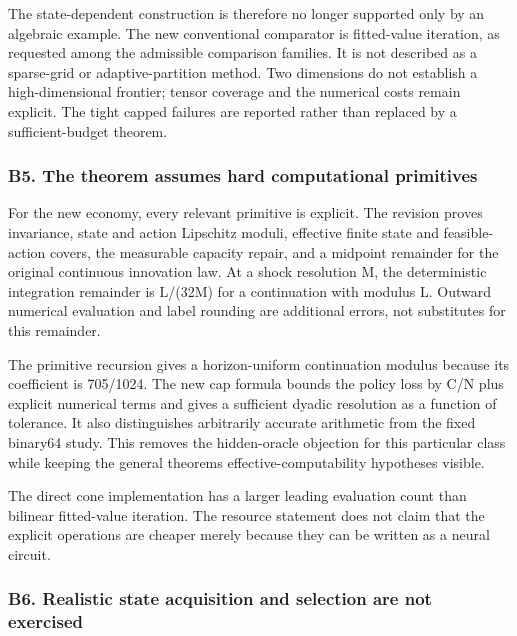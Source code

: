 \documentclass[ecta,nameyear,draft]{econsocart}
\begin{document}
The state-dependent construction is therefore no longer supported only
by an algebraic example. The new conventional comparator is fitted-value
iteration, as requested among the admissible comparison families. It is
not described as a sparse-grid or adaptive-partition method. Two
dimensions do not establish a high-dimensional frontier; tensor coverage
and the numerical costs remain explicit. The tight capped failures are
reported rather than replaced by a sufficient-budget theorem.

\hypertarget{b5-the-theorem-assumes-hard-computational-primitives}{%
\subsubsection{B5. The theorem assumes hard computational
primitives}\label{b5-the-theorem-assumes-hard-computational-primitives}}

For the new economy, every relevant primitive is explicit. The revision
proves invariance, state and action Lipschitz moduli, effective finite
state and feasible-action covers, the measurable capacity repair, and a
midpoint remainder for the original continuous innovation law. At a
shock resolution M, the deterministic integration remainder is L/(32M)
for a continuation with modulus L. Outward numerical evaluation and
label rounding are additional errors, not substitutes for this
remainder.

The primitive recursion gives a horizon-uniform continuation modulus
because its coefficient is 705/1024. The new cap formula bounds the
policy loss by C/N plus explicit numerical terms and gives a sufficient
dyadic resolution as a function of tolerance. It also distinguishes
arbitrarily accurate arithmetic from the fixed binary64 study. This
removes the hidden-oracle objection for this particular class while
keeping the general theorem\textquotesingle s effective-computability
hypotheses visible.

The direct cone implementation has a larger leading evaluation count
than bilinear fitted-value iteration. The resource statement does not
claim that the explicit operations are cheaper merely because they can
be written as a neural circuit.

\hypertarget{b6-realistic-state-acquisition-and-selection-are-not-exercised}{%
\subsubsection{B6. Realistic state acquisition and selection are not
exercised}\label{b6-realistic-state-acquisition-and-selection-are-not-exercised}}
\end{document}
